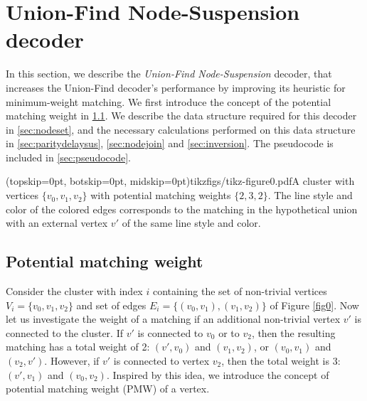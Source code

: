 \section{Union-Find Node-Suspension decoder}\label{sec:ufbb}

In this section, we describe the \emph{Union-Find Node-Suspension} decoder, that increases the Union-Find decoder's performance by improving its heuristic for minimum-weight matching. We first introduce the concept of the potential matching weight in \ref{sec:matchingweight}. We describe the data structure required for this decoder in \ref{sec:nodeset}, and the necessary calculations performed on this data structure in \ref{sec:paritydelaysus}, \ref{sec:nodejoin} and \ref{sec:inversion}. The pseudocode is included in \ref{sec:pseudocode}. 

\Figure[htb](topskip=0pt, botskip=0pt, midskip=0pt){tikzfigs/tikz-figure0.pdf}{A cluster with vertices $\{v_0, v_1, v_2\}$ with potential matching weights $\{2, 3, 2\}$. The line style and color of the colored edges corresponds to the matching in the hypothetical union with an external vertex $v'$ of the same line style and color.\label{fig0}}

\subsection{Potential matching weight}\label{sec:matchingweight}

Consider the cluster with index $i$ containing the set of non-trivial vertices $V_i=\{v_0,v_1,v_2\}$ and set of edges $E_i=\{(v_0,v_1), (v_1, v_2)\}$ of Figure \ref{fig0}. Now let us investigate the weight of a matching if an additional non-trivial vertex $v'$ is connected to the cluster. If $v'$ is connected to $v_0$ or to $v_2$, then the resulting matching has a total weight of 2: $(v',v_0)$ and $(v_1,v_2)$, or $(v_0,v_1)$ and $(v_2,v')$. However, if $v'$ is connected to vertex $v_2$, then the total weight is 3: $(v', v_1)$ and $(v_0, v_2)$. Inspired by this idea, we introduce the concept of potential matching weight (PMW) of a vertex. 

